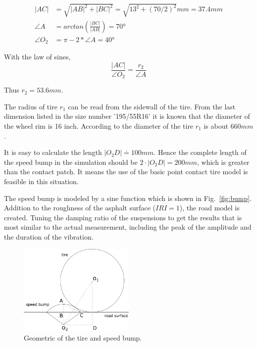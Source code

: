  \begin{align}
    |AC|&=\sqrt{|AB|^2+|BC|^2}=\sqrt{13^2+(70/2)^2}mm = 37.4mm \\
    \angle A &= arctan(\frac{|BC|}{|AB|}) = \ang{70} \\
    \angle O_2&= \pi - 2*\angle A = \ang{40}
 \end{align}
 
 With the law of sines,
 \begin{equation}
    \frac{|AC|}{\angle O_2} = \frac{r_2}{\angle A}
 \end{equation} 
 
 Thus $r_2 = 53.6mm$.
 
 The radius of tire $r_1$ can be read from the sidewall of the tire. 
 From the last dimension listed in the size number '195/55R16' it is known that the diameter of the wheel rim is 16 inch.
 According to \cite{Tire_calculator} the diameter of the tire $r_1$ is about $660mm$.
 
 It is easy to calculate the length $|O_2D| \doteq 100mm$.
 Hence the complete length of the speed bump in the simulation should be $2\cdot |O_2D| = 200mm$, which is greater than the contact patch.
 It means the use of the basic point contact tire model is feasible in this situation.
 
 The speed bump is modeled by a sine function which is shown in Fig.~\ref{fig:bump}.
 Addition to the roughness of the asphalt surface ($IRI=1$), the road model is created.
 Tuning the damping ratio of the suspensions to get the results that is most similar to the actual measurement, including the peak of the amplitude and the duration of the vibration.
 
 \begin{figure}
 \centering
 \includegraphics[width=0.5\textwidth]{bilder/validation.png}
 \caption{Geometric of the tire and speed bump.}
 \label{fig:tire_bump}
 \end{figure}
 
 
 
